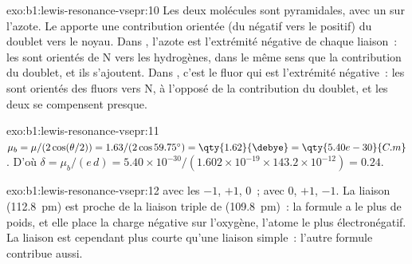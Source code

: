 \begin{solution}{exo:b1:lewis-resonance-vsepr:10}
Les deux molécules sont pyramidales, avec un  sur
l'azote. Le  apporte une contribution orientée (du
négatif vers le positif) du doublet vers le noyau. Dans , l'azote
est l'extrémité négative de chaque liaison~: les  sont
orientés de N vers les hydrogènes, dans le même sens que la contribution
du doublet, et ils s'ajoutent. Dans , c'est le fluor qui est
l'extrémité négative~: les  sont orientés des fluors
vers N, à l'opposé de la contribution du doublet, et les deux se
compensent presque.
\end{solution}

\begin{solution}{exo:b1:lewis-resonance-vsepr:11}
$\mu_b = \mu/(2\cos(\theta/2)) = 1.63/(2\cos 59.75^\circ) =
\qty{1.62}{\debye} = \qty{5.40e-30}{C.m}$. D'où $\delta = \mu_b/(e\,d) =
5.40 \times 10^{-30}/(1.602 \times 10^{-19} \times 143.2 \times 10^{-12})
= 0.24$.
\end{solution}

\begin{solution}{exo:b1:lewis-resonance-vsepr:12}
 avec les  $-1$, $+1$, $0$~;  avec
$0$, $+1$, $-1$. La liaison  (\qty{112.8}{pm}) est proche de la
liaison triple de  (\qty{109.8}{pm})~: la formule  a le
plus de poids, et elle place la charge négative sur l'oxygène, l'atome le
plus électronégatif. La liaison  est cependant plus courte
qu'une liaison simple~: l'autre formule contribue aussi.
\end{solution}


